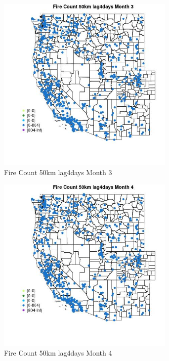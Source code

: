 \begin{figure} 
\centering  
\includegraphics[width=0.77\textwidth]{Code_Outputs/Report_ML_input_PM25_Step4_part_f_de_duplicated_aveswNAs_MapObsMo3Fire_Count_50km_lag4days.jpg} 
\caption{\label{fig:Report_ML_input_PM25_Step4_part_f_de_duplicated_aveswNAsMapObsMo3Fire_Count_50km_lag4days}Fire Count 50km lag4days Month 3} 
\end{figure} 
 

\clearpage 

\begin{figure} 
\centering  
\includegraphics[width=0.77\textwidth]{Code_Outputs/Report_ML_input_PM25_Step4_part_f_de_duplicated_aveswNAs_MapObsMo4Fire_Count_50km_lag4days.jpg} 
\caption{\label{fig:Report_ML_input_PM25_Step4_part_f_de_duplicated_aveswNAsMapObsMo4Fire_Count_50km_lag4days}Fire Count 50km lag4days Month 4} 
\end{figure} 
 

